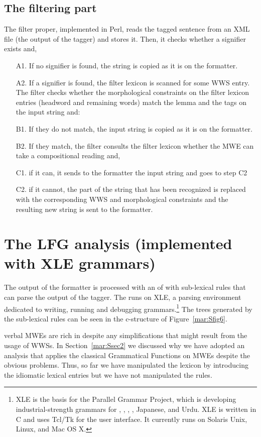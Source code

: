 \documentclass[output=paper]{langsci/langscibook}
\begin{document}
\subsection{The filtering part}
The filter proper, implemented in Perl, reads the tagged sentence from an \textsc{XML} file (the output of the tagger) and stores it. Then, it checks whether a signifier exists and, \\
\begin{enumerate}
\item[A1.] If no signifier is found, the string is copied as it is on the formatter. 
\item[A2.] If a signifier is found, the filter lexicon is scanned for some WWS entry. The filter checks whether the morphological constraints on the filter lexicon entries (headword and remaining words) match the lemma and the tags on the input string and:
\item[B1.] If they do not match, the input string is copied as it is on the formatter.
\item[B2.] If they match, the filter consults the filter lexicon whether the MWE can take a compositional reading and, 
\item[C1.] if it can, it sends to the formatter the input string and goes to step C2
\item[C2.] if it cannot, the part of the string that has been recognized is replaced with the corresponding WWS and morphological constraints and the resulting new string is sent to the formatter.
\end{enumerate}

\section{The LFG analysis (implemented with XLE grammars)}
The output of the formatter is processed with an   of  with sub-lexical rules that can parse the output of the tagger. The  runs on XLE, a parsing environment dedicated to writing, running and debugging  grammars.\footnote{XLE is the basis for the Parallel Grammar Project, which is developing industrial-strength grammars for , , , , Japanese, and Urdu. XLE is written in C and uses Tcl/Tk for the user interface. It currently runs on Solaris Unix, Linux, and Mac OS X.} The trees generated by the sub-lexical rules can be seen in the c-structure of Figure~\ref{mar:Sfig6}. 

 verbal MWEs are rich in  despite any simplifications that might result from the usage of WWSs. In Section~\ref{mar:Ssec2} we discussed why we have adopted an  analysis that applies the classical  Grammatical Functions on MWEs despite the obvious problems. Thus, so far we have manipulated the lexicon by introducing the idiomatic lexical entries but we have not manipulated the  rules.
\end{document}
